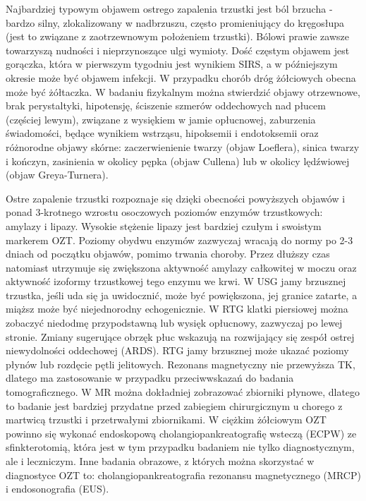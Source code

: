 \documentclass[a4paper, 12pt]{report}
\begin{document}
Najbardziej typowym objawem ostrego zapalenia trzustki jest ból
brzucha - bardzo silny, zlokalizowany w nadbrzuszu, często
promieniujący do kręgosłupa (jest to związane z zaotrzewnowym
położeniem trzustki). Bólowi prawie zawsze towarzyszą nudności i
nieprzynoszące ulgi wymioty. Dość częstym objawem jest gorączka, która
w pierwszym tygodniu jest wynikiem SIRS, a w późniejszym okresie może
być objawem infekcji. W przypadku chorób dróg żółciowych obecna może
być żółtaczka. W badaniu fizykalnym można stwierdzić objawy
otrzewnowe, brak perystaltyki, hipotensję, ściszenie szmerów oddechowych nad płucem
(częściej lewym), związane z wysiękiem w jamie opłucnowej, zaburzenia
świadomości, będące wynikiem wstrząsu, hipoksemii i endotoksemii 
oraz różnorodne objawy skórne: zaczerwienienie twarzy (objaw
Loeflera), sinica twarzy i kończyn, zasinienia w okolicy pępka (objaw
Cullena) lub w okolicy lędźwiowej (objaw Greya-Turnera).

Ostre zapalenie trzustki rozpoznaje się dzięki obecności powyższych
objawów i ponad 3-krotnego wzrostu osoczowych poziomów enzymów
trzustkowych: amylazy i lipazy. Wysokie stężenie lipazy jest
bardziej czułym i swoistym markerem OZT. Poziomy obydwu enzymów
zazwyczaj wracają do normy po 2-3 dniach od początku objawów, pomimo
trwania choroby. Przez dłuższy czas natomiast utrzymuje się zwiększona
aktywność amylazy całkowitej w moczu oraz aktywność izoformy
trzustkowej tego enzymu we krwi. W USG jamy brzusznej trzustka, jeśli
uda się ja uwidocznić, może być powiększona, jej granice zatarte, a
miąższ może być niejednorodny echogenicznie.  W RTG klatki piersiowej
można zobaczyć niedodmę przypodstawną lub wysięk opłucnowy, zazwyczaj
po lewej stronie. Zmiany sugerujące obrzęk płuc wskazują na
rozwijający się zespół ostrej niewydolności oddechowej (ARDS). RTG
jamy brzusznej może ukazać poziomy płynów lub rozdęcie pętli
jelitowych. Rezonans magnetyczny nie przewyższa TK, dlatego ma
zastosowanie w przypadku przeciwwskazań do badania tomograficznego. W
MR można dokładniej zobrazować zbiorniki płynowe, dlatego to badanie
jest bardziej przydatne przed zabiegiem chirurgicznym u chorego z
martwicą trzustki i przetrwałymi zbiornikami. W ciężkim żółciowym OZT
powinno się wykonać endoskopową cholangiopankreatografię wsteczą
(ECPW) ze sfinkterotomią, która jest w tym przypadku badaniem nie
tylko diagnostycznym, ale i leczniczym.  Inne badania obrazowe, z
których można skorzystać w diagnostyce OZT to:
cholangiopankreatografia rezonansu magnetycznego (MRCP) i
endosonografia (EUS).
\end{document}
